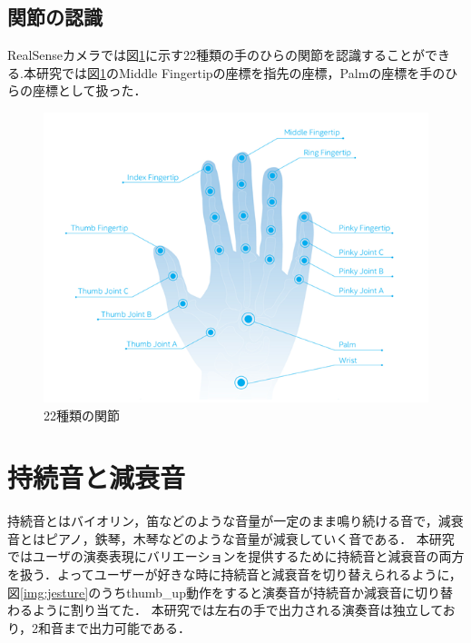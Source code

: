 \subsection{関節の認識}
RealSenseカメラでは図\ref{img:handlabels}に示す22種類の手のひらの関節を認識することができる.本研究では図\ref{img:handlabels}のMiddle Fingertipの座標を指先の座標，Palmの座標を手のひらの座標として扱った．
\begin{figure}[t]
	\begin{center}
		\includegraphics[width=1\linewidth]{./pics/03/hand_labels.png}
		\caption{22種類の関節\cite{hand_labels}}
		\label{img:handlabels} 
	\end{center}
\end{figure}

\section{持続音と減衰音}
持続音とはバイオリン，笛などのような音量が一定のまま鳴り続ける音で，減衰音とはピアノ，鉄琴，木琴などのような音量が減衰していく音である．
本研究ではユーザの演奏表現にバリエーションを提供するために持続音と減衰音の両方を扱う．よってユーザーが好きな時に持続音と減衰音を切り替えられるように，図\ref{img:jesture}のうちthumb\_up動作をすると演奏音が持続音か減衰音に切り替わるように割り当てた．
本研究では左右の手で出力される演奏音は独立しており，2和音まで出力可能である．

